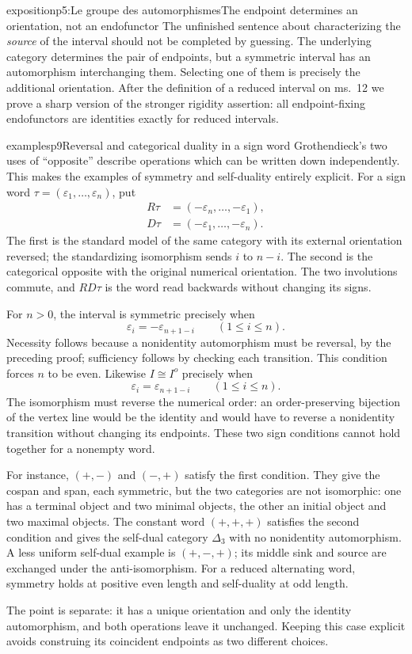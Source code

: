 \begin{dcomment}{exposition}{p5:Le groupe des automorphismes}{The endpoint determines an orientation, not an endofunctor}
The unfinished sentence about characterizing the \emph{source} of the interval should not be completed by guessing. The underlying category determines the pair of endpoints, but a symmetric interval has an automorphism interchanging them. Selecting one of them is precisely the additional orientation. After the definition of a reduced interval on ms.~12 we prove a sharp version of the stronger rigidity assertion: all endpoint-fixing endofunctors are identities exactly for reduced intervals.
\end{dcomment}

\begin{dcomment}{examples}{p9}{Reversal and categorical duality in a sign word}
Grothendieck's two uses of ``opposite'' describe operations which can be written down independently. This makes the examples of symmetry and self-duality entirely explicit. For a sign word $\tau=(\varepsilon_1,\ldots,\varepsilon_n)$, put
\[
\begin{aligned}
 R\tau&=(-\varepsilon_n,\ldots,-\varepsilon_1),\\
 D\tau&=(-\varepsilon_1,\ldots,-\varepsilon_n).
\end{aligned}
\]
The first is the standard model of the same category with its external orientation reversed; the standardizing isomorphism sends $i$ to $n-i$. The second is the categorical opposite with the original numerical orientation. The two involutions commute, and $RD\tau$ is the word read backwards without changing its signs.

For $n>0$, the interval is symmetric precisely when
\[
 \varepsilon_i=-\varepsilon_{n+1-i}\qquad(1\leq i\leq n).
\]
Necessity follows because a nonidentity automorphism must be reversal, by the preceding proof; sufficiency follows by checking each transition. This condition forces $n$ to be even. Likewise $I\cong I^o$ precisely when
\[
 \varepsilon_i=\varepsilon_{n+1-i}\qquad(1\leq i\leq n).
\]
The isomorphism must reverse the numerical order: an order-preserving bijection of the vertex line would be the identity and would have to reverse a nonidentity transition without changing its endpoints. These two sign conditions cannot hold together for a nonempty word.

For instance, $(+,-)$ and $(-,+)$ satisfy the first condition. They give the cospan and span, each symmetric, but the two categories are not isomorphic: one has a terminal object and two minimal objects, the other an initial object and two maximal objects. The constant word $(+,+,+)$ satisfies the second condition and gives the self-dual category $\Delta_3$ with no nonidentity automorphism. A less uniform self-dual example is $(+,-,+)$; its middle sink and source are exchanged under the anti-isomorphism. For a reduced alternating word, symmetry holds at positive even length and self-duality at odd length.

The point is separate: it has a unique orientation and only the identity automorphism, and both operations leave it unchanged. Keeping this case explicit avoids construing its coincident endpoints as two different choices.
\end{dcomment}

